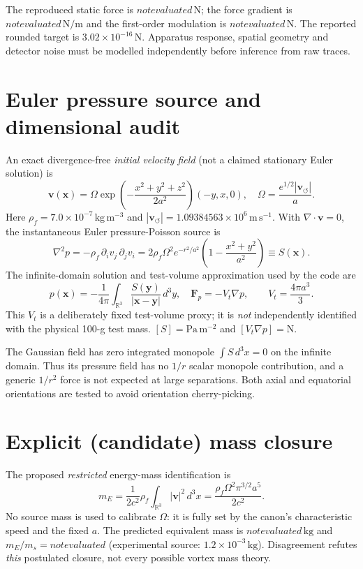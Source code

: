\documentclass[11pt,a4paper]{article}
\newcommand{\vswirl}{\mathbf v_{\!\boldsymbol{\circlearrowleft}}}
\newcommand{\rhoF}{\rho_{\!f}}
\newcommand{\AFORCE}{not evaluated}
\newcommand{\AGRAD}{not evaluated}
\newcommand{\ADELTA}{not evaluated}
\newcommand{\AMASS}{not evaluated}
\newcommand{\AMRATIO}{not evaluated}
\begin{document}
The reproduced static force is $\AFORCE\,\mathrm{N}$; the force gradient is $\AGRAD\,\mathrm{N/m}$ and the first-order modulation is $\ADELTA\,\mathrm{N}$. The reported rounded target is $3.02\times10^{-16}\,\mathrm{N}$. Apparatus response, spatial geometry and detector noise must be modelled independently before inference from raw traces.

\section{Euler pressure source and dimensional audit}
An exact divergence-free \emph{initial velocity field} (not a claimed stationary Euler solution) is
\begin{equation}\mathbf v(\mathbf x)=\Omega \exp\!\left(-\frac{x^2+y^2+z^2}{2a^2}\right)(-y,x,0),\quad
\Omega=\frac{e^{1/2}|\vswirl|}{a}.\end{equation}
Here $\rhoF=7.0\times10^{-7}\,\mathrm{kg\,m^{-3}}$ and $|\vswirl|=1.09384563\times 10^6\,\mathrm{m\,s^{-1}}$. With $\nabla\cdot\mathbf v=0$, the instantaneous Euler pressure-Poisson source is
\begin{equation}\nabla^2p=-\rhoF\,\partial_i v_j\,\partial_j v_i
=2\rhoF\Omega^2e^{-r^2/a^2}\left(1-\frac{x^2+y^2}{a^2}\right)\equiv S(\mathbf x).\end{equation}
The infinite-domain solution and test-volume approximation used by the code are
\begin{equation}p(\mathbf x)=-\frac{1}{4\pi}\int_{\mathbb R^3}\frac{S(\mathbf y)}{|\mathbf x-\mathbf y|}\,d^3y,\quad
\mathbf F_p=-V_t\nabla p,\qquad V_t=\frac{4\pi a^3}{3}.\end{equation}
This $V_t$ is a deliberately fixed test-volume proxy; it is \emph{not} independently identified with the physical 100-g test mass. $[S]=\mathrm{Pa\,m^{-2}}$ and $[V_t\nabla p]=\mathrm N$.

The Gaussian field has zero integrated monopole $\int S\,d^3x=0$ on the infinite domain. Thus its pressure field has no $1/r$ scalar monopole contribution, and a generic $1/r^2$ force is not expected at large separations. Both axial and equatorial orientations are tested to avoid orientation cherry-picking.

\section{Explicit (candidate) mass closure}
The proposed \emph{restricted} energy-mass identification is
\begin{equation}m_E=\frac{1}{2c^2}\rhoF\int_{\mathbb R^3}|\mathbf v|^2\,d^3x
=\frac{\rhoF\Omega^2\pi^{3/2}a^5}{2c^2}.
\end{equation}
No source mass is used to calibrate $\Omega$: it is fully set by the canon's characteristic speed and the fixed $a$. The predicted equivalent mass is $\AMASS\,\mathrm{kg}$ and $m_E/m_s=\AMRATIO$ (experimental source: $1.2\times10^{-3}\,\mathrm{kg}$). Disagreement refutes \emph{this} postulated closure, not every possible vortex mass theory.
\end{document}
